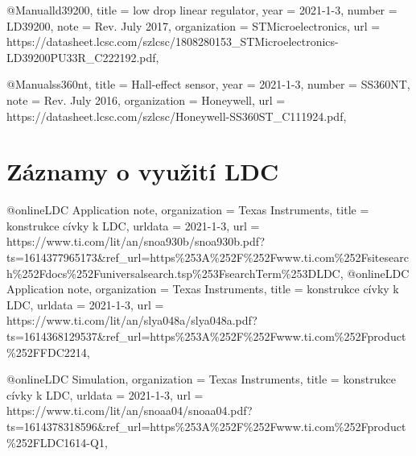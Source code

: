 @Manual{ld39200,
    title        = {low drop linear regulator},
    year         = {2021-1-3},
    number       = {LD39200},
    note         = {Rev. July 2017},
    organization = {STMicroelectronics},
    url          = {https://datasheet.lcsc.com/szlcsc/1808280153_STMicroelectronics-LD39200PU33R_C222192.pdf},
}

@Manual{ss360nt,
    title        = {Hall-effect sensor},
    year         = {2021-1-3},
    number       = {SS360NT},
    note         = {Rev. July 2016},
    organization = {Honeywell},
    url          = {https://datasheet.lcsc.com/szlcsc/Honeywell-SS360ST_C111924.pdf},
}

\section{Záznamy o využití LDC}
@online{LDC Application note,
    organization = {Texas Instruments},
    title        = {konstrukce cívky k LDC},
    urldata      = {2021-1-3},
    url          = {https://www.ti.com/lit/an/snoa930b/snoa930b.pdf?ts=1614377965173&ref_url=https\%253A\%252F\%252Fwww.ti.com\%252Fsitesearch\%252Fdocs\%252Funiversalsearch.tsp\%253FsearchTerm\%253DLDC},
}
@online{LDC Application note,
    organization = {Texas Instruments},
    title        = {konstrukce cívky k LDC},
    urldata      = {2021-1-3},
    url          = {https://www.ti.com/lit/an/slya048a/slya048a.pdf?ts=1614368129537&ref_url=https\%253A\%252F\%252Fwww.ti.com\%252Fproduct\%252FFDC2214},
}

@online{LDC Simulation,
    organization = {Texas Instruments},
    title        = {konstrukce cívky k LDC},
    urldata      = {2021-1-3},
    url          = {https://www.ti.com/lit/an/snoaa04/snoaa04.pdf?ts=1614378318596&ref_url=https\%253A\%252F\%252Fwww.ti.com\%252Fproduct\%252FLDC1614-Q1},
}                                                                                               

